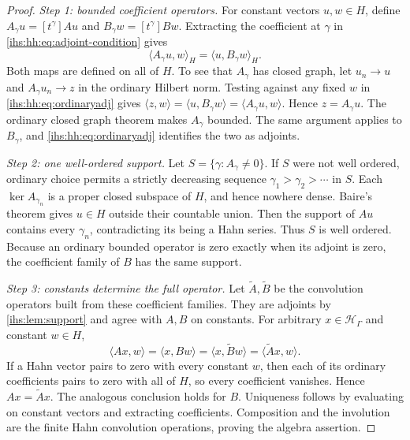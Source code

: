 \documentclass[11pt,a4paper]{article}
\numberwithin{equation}{section}
\theoremstyle{definition}
\theoremstyle{remark}
\newcommand{\Hil}{\mathcal H_\Gamma}
\newcommand{\ip}[2]{\langle#1,#2\rangle}
\begin{document}
\begin{proof}
\emph{Step 1: bounded coefficient operators.}
For constant vectors $u,w\in H$, define $A_\gamma u=[t^\gamma]Au$ and
$B_\gamma w=[t^\gamma]Bw$. Extracting the coefficient at $\gamma$ in
\eqref{ihs:hh:eq:adjoint-condition} gives
\begin{equation}\label{ihs:hh:eq:ordinaryadj}
 \ip{A_\gamma u}{w}_H=\ip{u}{B_\gamma w}_H.
\end{equation}
Both maps are defined on all of $H$. To see that $A_\gamma$ has closed
graph, let $u_n\to u$ and $A_\gamma u_n\to z$ in the ordinary Hilbert norm.
Testing against any fixed $w$ in \eqref{ihs:hh:eq:ordinaryadj} gives
$\ip{z}{w}=\ip{u}{B_\gamma w}=\ip{A_\gamma u}{w}$. Hence $z=A_\gamma u$. The
ordinary closed graph theorem makes $A_\gamma$ bounded. The same argument
applies to $B_\gamma$, and \eqref{ihs:hh:eq:ordinaryadj} identifies the two
as adjoints.

\emph{Step 2: one well-ordered support.}
Let $S=\{\gamma:A_\gamma\ne0\}$. If $S$ were not well ordered, ordinary
choice permits a strictly decreasing sequence
$\gamma_1>\gamma_2>\cdots$ in $S$. Each $\ker A_{\gamma_n}$ is a proper
closed subspace of $H$, and hence nowhere dense. Baire's theorem gives
$u\in H$ outside their countable union. Then the support of $Au$ contains
every $\gamma_n$, contradicting its being a Hahn series. Thus $S$ is well
ordered. Because an ordinary bounded operator is zero exactly when its
adjoint is zero, the coefficient family of $B$ has the same support.

\emph{Step 3: constants determine the full operator.}
Let $\widetilde A,\widetilde B$ be the convolution operators built from
these coefficient families. They are adjoints by \cref{ihs:lem:support} and
agree with $A,B$ on constants. For arbitrary $x\in\Hil$ and constant
$w\in H$,
\[
 \ip{Ax}{w}=\ip{x}{Bw}=\ip{x}{\widetilde B w}=\ip{\widetilde A x}{w}.
\]
If a Hahn vector pairs to zero with every constant $w$, then each of its
ordinary coefficients pairs to zero with all of $H$, so every coefficient
vanishes. Hence $Ax=\widetilde A x$. The analogous conclusion holds for $B$.
Uniqueness follows by evaluating on constant vectors and extracting
coefficients. Composition and the involution are the finite Hahn convolution
operations, proving the algebra assertion.
\end{proof}
\end{document}
